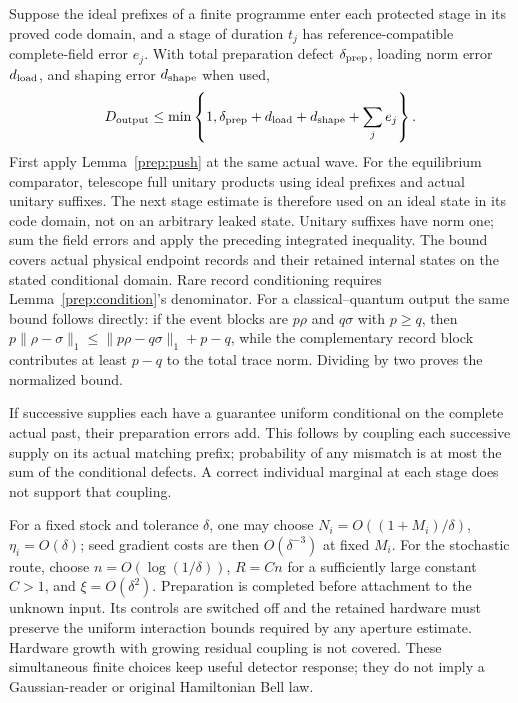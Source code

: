 \documentclass[11pt,oneside,openany]{book}
\theoremstyle{definition}
\theoremstyle{remark}\newtheorem{remark}[theorem]{Remark}
\begin{document}
Suppose the ideal prefixes of a finite programme enter each protected
stage in its proved code domain, and a stage of duration $t_j$ has
reference-compatible complete-field error $e_j$. With total preparation
defect $\delta_{\rm prep}$, loading norm error $d_{\rm load}$, and shaping
error $d_{\rm shape}$ when used,
\begin{equation}
 D_{\rm output}\le
 \min\left\{1,\delta_{\rm prep}+d_{\rm load}+d_{\rm shape}
                         +\sum_j e_j\right\}.
 \label{prep:completebudget}
\end{equation}
First apply Lemma~\ref{prep:push} at the same actual wave.
For the equilibrium comparator, telescope full unitary products using
ideal prefixes and actual unitary suffixes. The next stage estimate is
therefore used on an ideal state in its code domain, not on an arbitrary
leaked state. Unitary suffixes have norm one; sum the field errors and
apply the preceding integrated inequality. The bound covers actual
physical endpoint records and their retained internal states on the
stated conditional domain. Rare record conditioning requires
Lemma~\ref{prep:condition}'s denominator. For a classical--quantum
output the same bound follows directly: if the event blocks are
$p\rho$ and $q\sigma$ with $p\ge q$, then
$p\|\rho-\sigma\|_1\le\|p\rho-q\sigma\|_1+p-q$,
while the complementary record block contributes at least $p-q$ to
the total trace norm. Dividing by two proves the normalized bound.

If successive supplies each have a guarantee uniform conditional on the
complete actual past, their preparation errors add. This follows by
coupling each successive supply on its actual matching prefix; probability
of any mismatch is at most the sum of the conditional defects.
A correct individual marginal at each stage does not support that coupling.

For a fixed stock and tolerance $\delta$, one may choose
$N_i=O((1+M_i)/\delta)$, $\eta_i=O(\delta)$; seed gradient costs
are then $O(\delta^{-3})$ at fixed $M_i$.
For the stochastic route, choose $n=O(\log(1/\delta))$,
$R=Cn$ for a sufficiently large constant $C>1$, and
$\xi=O(\delta^2)$. Preparation is completed before attachment to the
unknown input. Its controls are switched off and the retained hardware
must preserve the uniform interaction bounds required by any aperture
estimate. Hardware growth with growing residual coupling is not covered.
These simultaneous finite choices keep useful detector response; they
do not imply a Gaussian-reader or original Hamiltonian Bell law.
\end{document}
